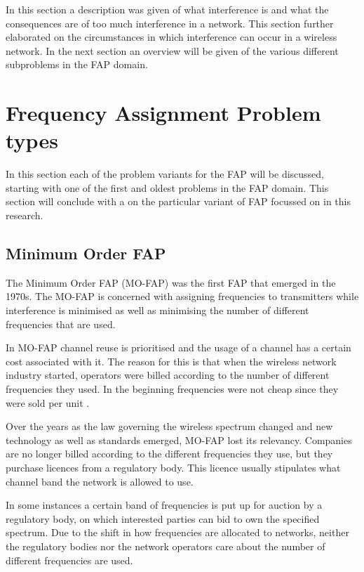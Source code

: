 In this section a description was given of what interference is and what the consequences are of too much interference in a network. This section further elaborated on the circumstances in which interference can occur in a wireless network. In the next section an overview will be given of the various different subproblems in the FAP domain.

\section{Frequency Assignment Problem types}
\label{sec:FAPVariants}
In this section each of the problem variants for the FAP will be discussed, starting with one of the first and oldest problems in the FAP domain. This section will conclude with a  on the particular variant of FAP focussed on in this research.
\subsection{Minimum Order FAP}
The Minimum Order FAP (MO-FAP) was the first FAP that emerged in the 1970s. The MO-FAP is concerned with assigning frequencies to transmitters while interference is minimised as well as minimising the number of different frequencies that are used\cite{Karen2004,MontemanniThesis}. 

In MO-FAP channel reuse is prioritised and the usage of a channel has a certain cost associated with it. The reason for this is that when the wireless network industry started, operators were billed according to the number of different frequencies they used. In the beginning frequencies were not cheap since they were sold per unit \cite{Karen2004,MontemanniThesis}. 

Over the years as the law governing the wireless spectrum changed and new technology as well as standards emerged, MO-FAP lost its relevancy\cite{Karen2004,MontemanniThesis}. Companies are no longer billed according to the different frequencies they use, but they purchase licences from a regulatory body\cite{Karen2004,MontemanniThesis}. This licence usually stipulates what channel band the network is allowed to use.

In some instances a certain band of frequencies is put up for auction by a regulatory body, on which interested parties can bid to own the specified spectrum\cite{Karen2004,MontemanniThesis}. Due to the shift in how frequencies are allocated to networks, neither the regulatory bodies nor the network operators care about the number of different frequencies are used\cite{Karen2004,MontemanniThesis}.

